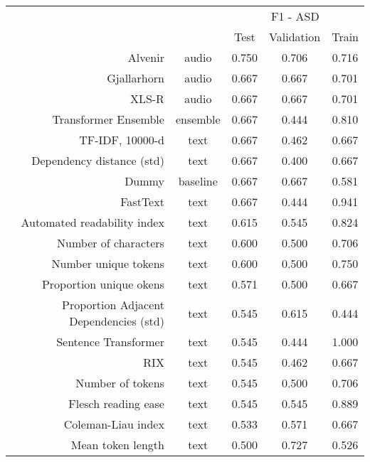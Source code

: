 \begin{tabular}{rc||ccc}
\toprule
\multicolumn{1}{c}{} & \multicolumn{1}{c}{} & \multicolumn{3}{c}{F1 - ASD} \\
                                        &&     Test & Validation & Train \\
\midrule
\hline
                                Alvenir &    audio &    0.750 &      0.706 & 0.716 \\
                            Gjallarhorn &    audio &    0.667 &      0.667 & 0.701 \\
                                  XLS-R &    audio &    0.667 &      0.667 & 0.701 \\
                   Transformer Ensemble & ensemble &    0.667 &      0.444 & 0.810 \\
                        TF-IDF, 10000-d &     text &    0.667 &      0.462 & 0.667 \\
              Dependency distance (std) &     text &    0.667 &      0.400 & 0.667 \\
                                  Dummy & baseline &    0.667 &      0.667 & 0.581 \\
                               FastText &     text &    0.667 &      0.444 & 0.941 \\
            Automated readability index &     text &    0.615 &      0.545 & 0.824 \\
                   Number of characters &     text &    0.600 &      0.500 & 0.706 \\
                   Number unique tokens &     text &    0.600 &      0.500 & 0.750 \\
                Proportion unique okens &     text &    0.571 &      0.500 & 0.667 \\
 Proportion Adjacent Dependencies (std) &     text &    0.545 &      0.615 & 0.444 \\
                   Sentence Transformer &     text &    0.545 &      0.444 & 1.000 \\
                                    RIX &     text &    0.545 &      0.462 & 0.667 \\
                       Number of tokens &     text &    0.545 &      0.500 & 0.706 \\
                    Flesch reading ease &     text &    0.545 &      0.545 & 0.889 \\
                     Coleman-Liau index &     text &    0.533 &      0.571 & 0.667 \\
                      Mean token length &     text &    0.500 &      0.727 & 0.526 \\

\end{tabular}

